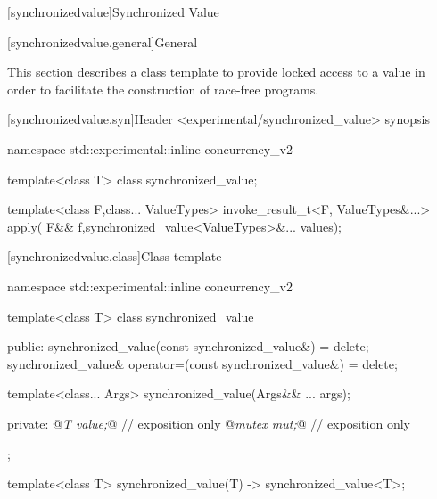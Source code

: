 \setcounter{chapter}{7}
[synchronizedvalue]{Synchronized Value}

[synchronizedvalue.general]{General}

This section describes a class template to provide locked access to a
value in order to facilitate the construction of race-free programs.

[synchronizedvalue.syn]{Header <experimental/synchronized_value> synopsis}

\begin{codeblock}
namespace std::experimental::inline concurrency_v2 {
    template<class T>
    class synchronized_value;

    template<class F,class... ValueTypes>
    invoke_result_t<F, ValueTypes&...> apply(
        F&& f,synchronized_value<ValueTypes>&... values);
}
\end{codeblock}

[synchronizedvalue.class]{Class template  }

\begin{codeblock}
namespace std::experimental::inline concurrency_v2 {
  template<class T>
    class synchronized_value
    {
    public:
        synchronized_value(const synchronized_value&) = delete;
        synchronized_value& operator=(const synchronized_value&) = delete;

        template<class... Args>
        synchronized_value(Args&& ... args);

    private:
        @\emph{T value;}@   // exposition only
        @\emph{mutex mut;}@ // exposition only
    };

template<class T>
synchronized_value(T)
-> synchronized_value<T>;
}
\end{codeblock}

